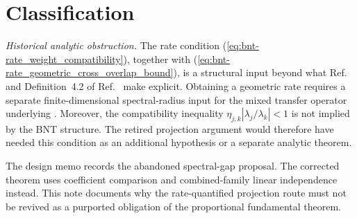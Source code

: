 \documentclass{article}
\begin{document}
\section{Classification}

\emph{Historical analytic obstruction.} The rate condition
(\ref{eq:bnt-rate_weight_compatibility}), together with
(\ref{eq:bnt-rate_geometric_cross_overlap_bound}), is a structural input beyond
what Ref.~\cite[\S II]{Cirac2016MPDO_arXiv} and
Definition~4.2 of Ref.~\cite{Cirac2021Matrix} make explicit. Obtaining a
geometric rate requires a separate finite-dimensional spectral-radius input
for the mixed transfer operator underlying
.
Moreover, the compatibility inequality
$\eta_{j,k}|\lambda_j/\lambda_k|<1$ is not implied by the BNT structure. The
retired projection argument would therefore have needed this condition as an
additional hypothesis or a separate analytic theorem.

The design memo
 records the
abandoned spectral-gap proposal. The corrected  theorem uses
coefficient comparison and combined-family linear independence instead. This
note documents why the rate-quantified projection route must not be revived as
a purported obligation of the proportional fundamental theorem.



\end{document}
